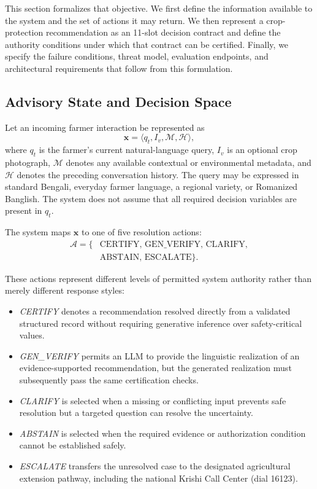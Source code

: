 \documentclass[a4paper,fleqn]{cas-dc}
\begin{document}
This section formalizes that objective. We first define the information available to the system and the set of actions it may return. We then represent a crop-protection recommendation as an 11-slot decision contract and define the authority conditions under which that contract can be certified. Finally, we specify the failure conditions, threat model, evaluation endpoints, and architectural requirements that follow from this formulation.

\subsection{Advisory State and Decision Space}

Let an incoming farmer interaction be represented as
\begin{equation}
\mathbf{x} = \langle q_t, I_v, \mathcal{M}, \mathcal{H} \rangle,
\end{equation}
where $q_t$ is the farmer's current natural-language query, $I_v$ is an optional crop photograph, $\mathcal{M}$ denotes any available contextual or environmental metadata, and $\mathcal{H}$ denotes the preceding conversation history. The query may be expressed in standard Bengali, everyday farmer language, a regional variety, or Romanized Banglish. The system does not assume that all required decision variables are present in $q_t$.

The system maps $\mathbf{x}$ to one of five resolution actions:
\begin{equation}
\begin{aligned}
\mathcal{A} = \{ & \mathrm{CERTIFY},\, \mathrm{GEN\_VERIFY},\, \mathrm{CLARIFY}, \\
& \mathrm{ABSTAIN},\, \mathrm{ESCALATE} \}.
\end{aligned}
\end{equation}

These actions represent different levels of permitted system authority rather than merely different response styles:
\begin{itemize}
    \item \textit{CERTIFY} denotes a recommendation resolved directly from a validated structured record without requiring generative inference over safety-critical values.
    \item \textit{GEN\_VERIFY} permits an LLM to provide the linguistic realization of an evidence-supported recommendation, but the generated realization must subsequently pass the same certification checks.
    \item \textit{CLARIFY} is selected when a missing or conflicting input prevents safe resolution but a targeted question can resolve the uncertainty.
    \item \textit{ABSTAIN} is selected when the required evidence or authorization condition cannot be established safely.
    \item \textit{ESCALATE} transfers the unresolved case to the designated agricultural extension pathway, including the national Krishi Call Center (dial 16123).
\end{itemize}
\end{document}
